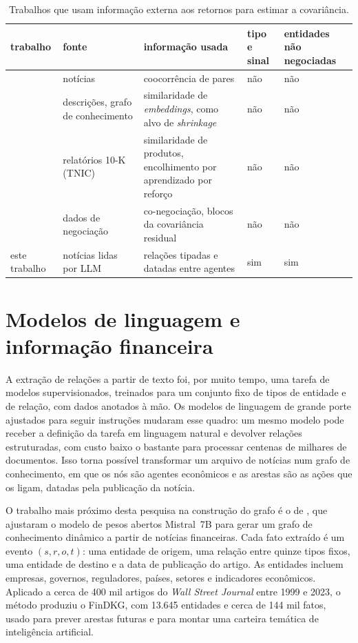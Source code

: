 \begin{table}[htbp]
\centering
\small
\caption{Trabalhos que usam informação externa aos retornos para estimar a covariância.}
\label{tab:antecedentes}
\begin{tabularx}{\textwidth}{>{\raggedright\arraybackslash}p{2.5cm}>{\raggedright\arraybackslash}p{2.6cm}>{\raggedright\arraybackslash}X>{\centering\arraybackslash}p{1.4cm}>{\centering\arraybackslash}p{1.6cm}}
\toprule
trabalho & fonte & informação usada & tipo e sinal & entidades não negociadas \\
\midrule
\citet{tang2019} & notícias & coocorrência de pares & não & não \\
\citet{becquin2023} & descrições, grafo de conhecimento & similaridade de \emph{embeddings}, como alvo de \emph{shrinkage} & não & não \\
\citet{lu2024} & relatórios 10-K (TNIC) & similaridade de produtos, encolhimento por aprendizado por reforço & não & não \\
\citet{lu2023} & dados de negociação & co-negociação, blocos da covariância residual & não & não \\
este trabalho & notícias lidas por LLM & relações tipadas e datadas entre agentes & sim & sim \\
\bottomrule
\end{tabularx}
\end{table}

\section{Modelos de linguagem e informação financeira}
\label{sec:llm}

A extração de relações a partir de texto foi, por muito tempo, uma tarefa de modelos supervisionados,
treinados para um conjunto fixo de tipos de entidade e de relação, com dados anotados à mão. Os modelos
de linguagem de grande porte ajustados para seguir instruções mudaram esse quadro: um mesmo modelo pode
receber a definição da tarefa em linguagem natural e devolver relações estruturadas, com custo baixo o
bastante para processar centenas de milhares de documentos. Isso torna possível transformar um arquivo
de notícias num grafo de conhecimento, em que os nós são agentes econômicos e as arestas são as ações
que os ligam, datadas pela publicação da notícia.

O trabalho mais próximo desta pesquisa na construção do grafo é o de \citet{li2024findkg}, que ajustaram
o modelo de pesos abertos Mistral~7B \citep{jiang2023mistral} para gerar um grafo de conhecimento dinâmico a
partir de notícias financeiras. Cada fato extraído é um evento $(s,r,o,t)$: uma entidade de origem, uma
relação entre quinze tipos fixos, uma entidade de destino e a data de publicação do artigo. As entidades
incluem empresas, governos, reguladores, países, setores e indicadores econômicos. Aplicado a cerca de 400
mil artigos do \emph{Wall Street Journal} entre 1999 e 2023, o método produziu o FinDKG, com 13.645
entidades e cerca de 144 mil fatos, usado para prever arestas futuras e para montar uma carteira temática
de inteligência artificial.

